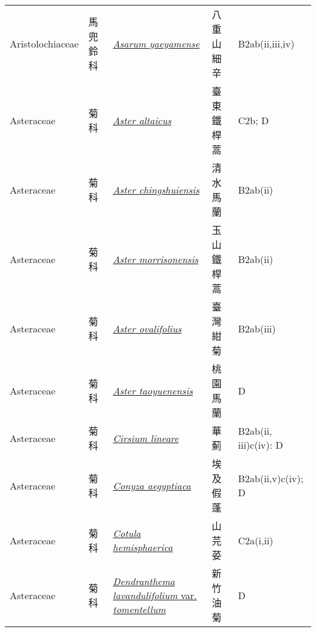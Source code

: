 {\begin{longtable}{p{2.5cm}p{2.5cm}p{4.5cm}p{2.5cm}p{3cm}}
    Aristolochiaceae & 馬兜鈴科 & \href{http://www.theplantlist.org/tpl1.1/search?q=Asarum+yaeyamense}{\textit{Asarum yaeyamense} } & 八重山細辛 & B2ab(ii,iii,iv) \index{Asarum@\textit{Asarum}!yaeyamense@\textit{yaeyamense}}  \index{八重山細辛} \\
    Asteraceae & 菊科 & \href{http://www.theplantlist.org/tpl1.1/search?q=Aster+altaicus}{\textit{Aster altaicus} } & 臺東鐵桿蒿 & C2b; D \index{Aster@\textit{Aster}!altaicus@\textit{altaicus}}  \index{臺東鐵桿蒿} \\
    Asteraceae & 菊科 & \href{http://www.theplantlist.org/tpl1.1/search?q=Aster+chingshuiensis}{\textit{Aster chingshuiensis} } & 清水馬蘭 & B2ab(ii) \index{Aster@\textit{Aster}!chingshuiensis@\textit{chingshuiensis}}  \index{清水馬蘭} \\
    Asteraceae & 菊科 & \href{http://www.theplantlist.org/tpl1.1/search?q=Aster+morrisonensis}{\textit{Aster morrisonensis} } & 玉山鐵桿蒿 & B2ab(ii) \index{Aster@\textit{Aster}!morrisonensis@\textit{morrisonensis}}  \index{玉山鐵桿蒿} \\
    Asteraceae & 菊科 & \href{http://www.theplantlist.org/tpl1.1/search?q=Aster+ovalifolius}{\textit{Aster ovalifolius} } & 臺灣紺菊 & B2ab(iii) \index{Aster@\textit{Aster}!ovalifolius@\textit{ovalifolius}}  \index{臺灣紺菊} \\
    Asteraceae & 菊科 & \href{http://www.theplantlist.org/tpl1.1/search?q=Aster+taoyuenensis}{\textit{Aster taoyuenensis} } & 桃園馬蘭 & D \index{Aster@\textit{Aster}!taoyuenensis@\textit{taoyuenensis}}  \index{桃園馬蘭} \\
    Asteraceae & 菊科 & \href{http://www.theplantlist.org/tpl1.1/search?q=Cirsium+lineare}{\textit{Cirsium lineare} } & 華薊 & B2ab(ii, iii)c(iv): D \index{Cirsium@\textit{Cirsium}!lineare@\textit{lineare}}  \index{華薊} \\
    Asteraceae & 菊科 & \href{http://www.theplantlist.org/tpl1.1/search?q=Conyza+aegyptiaca}{\textit{Conyza aegyptiaca} } & 埃及假蓬 & B2ab(ii,v)c(iv); D \index{Conyza@\textit{Conyza}!aegyptiaca@\textit{aegyptiaca}}  \index{埃及假蓬} \\
    Asteraceae & 菊科 & \href{http://www.theplantlist.org/tpl1.1/search?q=Cotula+hemisphaerica}{\textit{Cotula hemisphaerica} } & 山芫荽 & C2a(i,ii) \index{Cotula@\textit{Cotula}!hemisphaerica@\textit{hemisphaerica}}  \index{山芫荽} \\
    Asteraceae & 菊科 & \href{http://www.theplantlist.org/tpl1.1/search?q=Dendranthema+lavandulifolium+var.+tomentellum}{\textit{Dendranthema lavandulifolium} var. \textit{tomentellum} } & 新竹油菊 & D \index{Dendranthema@\textit{Dendranthema}!lavandulifolium@\textit{lavandulifolium}!var. tomentellum@var. \textit{tomentellum}}  \index{新竹油菊} \\

\end{longtable}}
